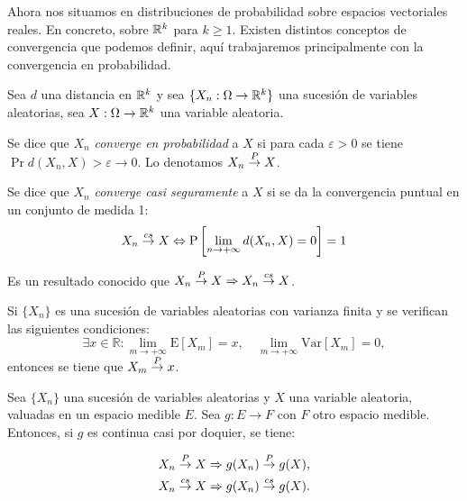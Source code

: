 Ahora nos situamos en distribuciones de probabilidad sobre espacios vectoriales reales. En concreto, sobre $\mathbb{R}^k$ para $k\geq 1$. Existen distintos conceptos de convergencia que podemos definir, aquí trabajaremos principalmente con la convergencia en probabilidad.

Sea \(d\) una distancia en \(\mathbb{R}^k\) y sea
\(\{X_n:\Omega\rightarrow\mathbb{R}^k\}\) una sucesión de variables aleatorias,
sea \(X:\Omega \rightarrow \mathbb{R}^k\) una variable aleatoria.

Se dice que \(X_n\) \emph{converge en probabilidad} a \(X\) si para cada
\(\varepsilon>0\) se tiene \(\Pr{d(X_n, X)>\varepsilon}\rightarrow 0\). Lo
denotamos \(X_n\overset{P}{\rightarrow} X\). 

Se dice que \(X_n\) \emph{converge casi seguramente} a \(X\) si se da la
convergencia puntual en un conjunto de medida 1:
\[X_n\overset{cs}{\rightarrow} X\Leftrightarrow \mathrm{P}\left[\lim_{n\rightarrow +\infty} d(X_n, X)=0\right]=1\]

Es un resultado conocido que \(X_n\overset{P}{\rightarrow} X\Rightarrow X_n\overset{cs}{\rightarrow} X\).

\lemmab
\label{lm:convergencia-va} Si \(\{X_n\}\) es una sucesión de variables
aleatorias con varianza finita y se verifican las siguientes
condiciones:
\[\exists x\in \mathbb R:\lim_{m\rightarrow +\infty} \mathrm{E}[X_m]=x,\quad \lim_{m\rightarrow +\infty} \mathrm{Var}[X_m]=0,\]
entonces se tiene que \(X_m\overset{P}{\rightarrow} x\). \lemmae

\label{th:cont-map-conv} Sea \(\{X_n\}\) una sucesión de variables
aleatorias y \(X\) una variable aleatoria, valuadas en un espacio
medible \(E\). Sea \(g:E\rightarrow F\) con \(F\) otro espacio medible.
Entonces, si \(g\) es continua casi por doquier, se tiene:

\begin{gather*}
  X_n\overset{P}{\rightarrow} X \Rightarrow g(X_n)\overset{P}{\rightarrow} g(X),\\
  X_n\overset{cs}{\rightarrow} X \Rightarrow g(X_n)\overset{cs}{\rightarrow} g(X).
\end{gather*}

\theoe



